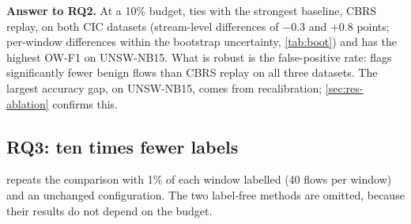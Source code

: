 \begin{table}[t]
\centering
\caption{Per-window difference \nova{} minus method, in points, with 95\% moving-block bootstrap intervals. OW-F1 at
budgets 10\% and 1\% (positive: \nova{} better), and false-positive rate at 10\% (negative: \nova{} flags fewer
benign flows). Intervals that exclude zero are significant.}
\label{tab:boot}
\small
\setlength{\tabcolsep}{3pt}
%
%
\end{table}

\textbf{Answer to RQ2.} At a 10\% budget, \nova{} ties with the strongest baseline, CBRS replay, on both CIC
datasets (stream-level differences of $-0.3$ and $+0.8$ points; per-window differences within the bootstrap
uncertainty, \cref{tab:boot}) and has the highest OW-F1 on UNSW-NB15. What is robust is the false-positive rate: \nova{} flags significantly
fewer benign flows than CBRS replay on all three datasets. The largest accuracy gap, on UNSW-NB15, comes from
recalibration; \cref{sec:res-ablation} confirms this.

\subsection{RQ3: ten times fewer labels}
\label{sec:res-budget}
 repeats the comparison with 1\% of each window labelled (40 flows per window) and an unchanged
configuration. The two label-free methods are omitted, because their results do not depend on the budget.

\begin{table}[t]
\centering
\caption{Label budget 1\%: OW macro-F1 and false-positive rate (\%), mean over five seeds; best per column in
bold.}
\label{tab:budget}
\small
\setlength{\tabcolsep}{4pt}
\end{table}


